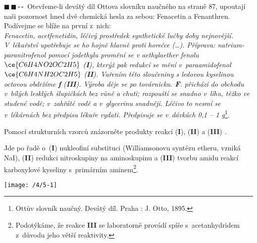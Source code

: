 \documentclass{book}
\newcommand{\dva}{$\blacksquare \, \blacksquare \, \square \, \square \; \; $}
\renewenvironment{quotation}{\par}{\par} %
\begin{document}
\newpage %
\begin{quotation}
\dva Otevřeme-li devátý díl Ottova slovníku naučného na straně 87, upoutají
naši pozornost hned dvě chemická hesla za sebou: Fenacetin a Fenanthren.
Podívejme se blíže na první z~nich: \\
\textit{Fenacetin, acetfenetidin, léčivý prostředek synthetické lučby doby
nejnovější. V~lékařství upotřebuje se ho hojně hlavně proti horečce (\ldots).
Příprava: natrium-paranitrofenol pomocí jodethylu promění se
v aethylaether fenolu $\ce{C6H4NO2OC2H5}$ (\textbf{I}), kterýž pak redukcí
se mění v~paraamidofenol $\ce{C6H4NH2OC2H5}$ (\textbf{II}). Vařením této sloučeniny
s ledovou kyselinou octovou obdržíme \textbf{f} (\textbf{III}). Výroba děje se po továrnicku.
\textbf{F}. přichází do obchodu v~bílých lesklých šlupičkách bez vůně a chuti;
rozpouští se snadno v~líhu, těžko ve studené vodě; v~zahřáté vodě
a v~glycerinu snadněji. Léčivo to nesmí se v~lékárnách bez předpisu
lékaře vydati. Předpisuje se v~dávkách 0,1 -- 1 g}\footnote{Ottův slovník naučný. Devátý díl. Praha : J. Otto, 1895.}.

Pomocí strukturních vzorců znázorněte produkty reakcí (\textbf{I}), (\textbf{II}) a (\textbf{III}) .

\end{quotation} \dotfill \par 
Jde po řadě o~(\textbf{I}) nukleofiní substituci (Williamsonovu syntézu etheru,
vzniká NaI), (\textbf{II}) redukci nitroskupiny na aminoskupinu a (\textbf{III}) tvorbu
amidu reakcí karboxylové kyseliny s~primárním aminem\footnote{Podotýkáme, že reakce \textbf{III} se laboratorně provádí spíše s~acetanhydridem z~důvodu jeho větší reaktivity.}. 
\noindent \begin{center}

\texttt{[image: /4/5-1]}

\par\end{center}
\end{document}
